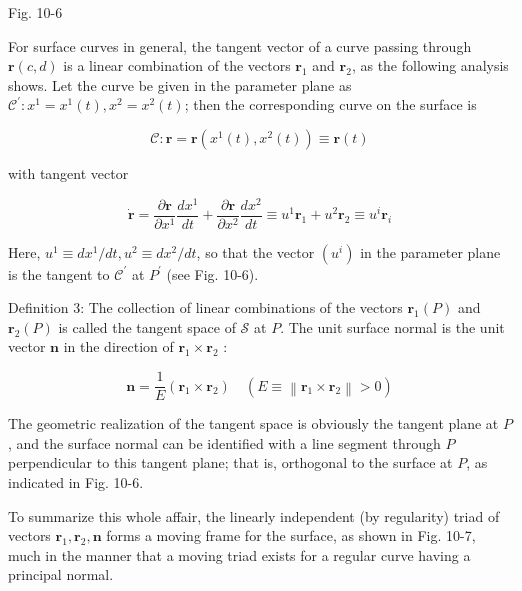 \documentclass[10pt]{article}
\begin{document}
Fig. 10-6

For surface curves in general, the tangent vector of a curve passing through $\mathbf{r}(c, d)$ is a linear combination of the vectors $\mathbf{r}_{1}$ and $\mathbf{r}_{2}$, as the following analysis shows. Let the curve be given in the parameter plane as $\mathscr{C}^{\prime}: x^{1}=x^{1}(t), x^{2}=x^{2}(t)$; then the corresponding curve on the surface is

$$
\mathscr{C}: \mathbf{r}=\mathbf{r}\left(x^{1}(t), x^{2}(t)\right) \equiv \mathbf{r}(t)
$$

with tangent vector


\begin{equation*}
\dot{\mathbf{r}}=\frac{\partial \mathbf{r}}{\partial x^{1}} \frac{d x^{1}}{d t}+\frac{\partial \mathbf{r}}{\partial x^{2}} \frac{d x^{2}}{d t} \equiv u^{1} \mathbf{r}_{1}+u^{2} \mathbf{r}_{2} \equiv u^{i} \mathbf{r}_{i} \tag{10.12}
\end{equation*}


Here, $u^{1} \equiv d x^{1} / d t, u^{2} \equiv d x^{2} / d t$, so that the vector $\left(u^{i}\right)$ in the parameter plane is the tangent to $\mathscr{C}^{\prime}$ at $P^{\prime}$ (see Fig. 10-6).

Definition 3: The collection of linear combinations of the vectors $\mathbf{r}_{1}(P)$ and $\mathbf{r}_{2}(P)$ is called the tangent space of $\mathscr{S}$ at $P$. The unit surface normal is the unit vector $\mathbf{n}$ in the direction of $\mathbf{r}_{1} \times \mathbf{r}_{2}$ :


\begin{equation*}
\mathbf{n}=\frac{1}{E}\left(\mathbf{r}_{1} \times \mathbf{r}_{2}\right) \quad\left(E \equiv\left\|\mathbf{r}_{1} \times \mathbf{r}_{2}\right\|>0\right) \tag{10.13}
\end{equation*}


The geometric realization of the tangent space is obviously the tangent plane at $P$, and the surface normal can be identified with a line segment through $P$ perpendicular to this tangent plane; that is, orthogonal to the surface at $P$, as indicated in Fig. 10-6.

To summarize this whole affair, the linearly independent (by regularity) triad of vectors $\mathbf{r}_{1}, \mathbf{r}_{2}, \mathbf{n}$ forms a moving frame for the surface, as shown in Fig. 10-7, much in the manner that a moving triad exists for a regular curve having a principal normal.
\end{document}

